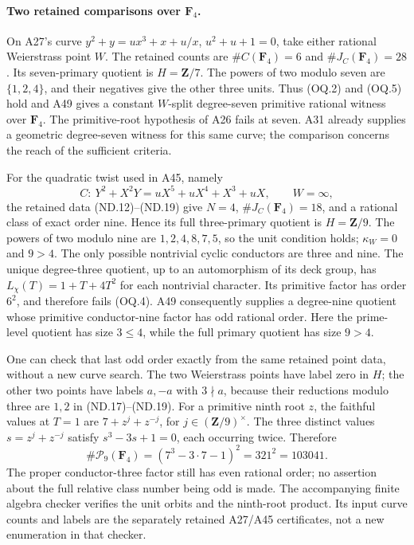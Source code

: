 \documentclass[11pt,a4paper]{article}
\begin{document}
\paragraph{Two retained comparisons over $\mathbf F_4$.}
On A27's curve
$y^2+y=ux^3+x+u/x$, $u^2+u+1=0$, take either rational
Weierstrass point $W$. The retained counts are
$\#C(\mathbf F_4)=6$ and $\#J_C(\mathbf F_4)=28$.
Its seven-primary quotient is $H=\mathbf Z/7$.
The powers of two modulo seven are $\{1,2,4\}$, and their
negatives give the other three units. Thus (OQ.2) and (OQ.5)
hold and A49 gives a constant $W$-split degree-seven primitive
rational witness over $\mathbf F_4$. The primitive-root
hypothesis of A26 fails at seven. A31 already supplies a
geometric degree-seven witness for this same curve; the
comparison concerns the reach of the sufficient criteria.

For the quadratic twist used in A45, namely
\[
          C:\ Y^2+X^2Y=uX^5+uX^4+X^3+uX,
                     \qquad W=\infty,
 \tag{OQ.14}
\]
the retained data (ND.12)--(ND.19) give $N=4$,
$\#J_C(\mathbf F_4)=18$, and a rational class of exact
order nine. Hence its full three-primary quotient is
$H=\mathbf Z/9$. The powers of two modulo nine are
$1,2,4,8,7,5$, so the unit condition holds; $\kappa_W=0$
and $9>4$. The only possible nontrivial cyclic conductors
are three and nine. The unique degree-three quotient,
up to an automorphism of its deck group, has
$L_\chi(T)=1+T+4T^2$ for each nontrivial character.
Its primitive factor has order $6^2$, and therefore fails
(OQ.4). A49 consequently supplies a degree-nine quotient
whose primitive conductor-nine factor has odd rational order.
Here the prime-level quotient has size $3\le4$, while the
full primary quotient has size $9>4$.

One can check that last odd order exactly from the same retained
point data, without a new curve search. The two Weierstrass
points have label zero in $H$; the other two points have labels
$a,-a$ with $3\nmid a$, because their reductions modulo three
are $1,2$ in (ND.17)--(ND.19). For a primitive ninth root $z$,
the faithful values at $T=1$ are $7+z^j+z^{-j}$, for
$j\in(\mathbf Z/9)^\times$. The three distinct values
$s=z^j+z^{-j}$ satisfy $s^3-3s+1=0$, each occurring twice.
Therefore
\[
 \#\mathcal P_9(\mathbf F_4)
     =\left(7^3-3\cdot7-1\right)^2
     =321^2=103041.
 \tag{OQ.15}
\]
The proper conductor-three factor still has even rational order;
no assertion about the full relative class number being odd
is made. The accompanying finite algebra checker verifies the
unit orbits and the ninth-root product. Its input curve counts
and labels are the separately retained A27/A45 certificates,
not a new enumeration in that checker.
\end{document}
